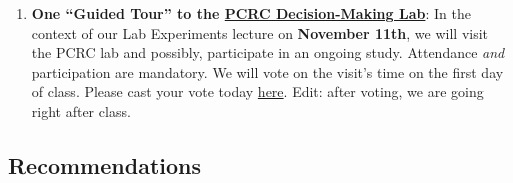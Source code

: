 \documentclass[letterpaper]{article}
\begin{document}
\begin{enumerate}
\item {\bf One ``Guided Tour'' to the \href{https://pcrclab.utu.fi/?page_id=894&lang=en}{PCRC Decision-Making Lab}}: In the context of our Lab Experiments lecture on {\bf November 11th}, we will visit the PCRC lab and possibly, participate in an ongoing study. Attendance \emph{and} participation are mandatory. We will vote on the visit's time on the first day of class. Please cast your vote today \href{https://doodle.com/meeting/participate/id/dLnyLoXa}{here}. {\color{red}Edit: after voting, we are going right after class}.

  


\end{enumerate}



\subsection*{Recommendations}
\end{document}
